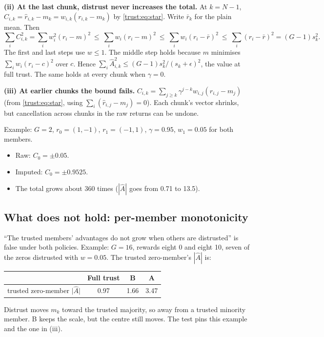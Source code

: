 \textbf{(ii) At the last chunk, distrust never increases the total.} At $k=N-1$,
$C_{i,k}=\hat r_{i,k}-m_k=w_{i,k}(r_{i,k}-m_k)$ by \eqref{trust:eq:star}. Write $\bar r_k$ for the
plain mean. Then
\[
\sum_i C_{i,k}^2=\sum_i w_i^2(r_i-m)^2\ \le\ \sum_i w_i(r_i-m)^2\ \le\ \sum_i w_i(r_i-\bar r)^2\ \le\
\sum_i (r_i-\bar r)^2=(G-1)s_k^2 .
\]
The first and last steps use $w\le1$. The middle step holds because $m$ minimises
$\sum_i w_i(r_i-c)^2$ over $c$. Hence $\sum_i\hat A_{i,k}^2\le (G-1)s_k^2/(s_k+\epsilon)^2$, the
value at full trust. The same holds at every chunk when $\gamma=0$.

\textbf{(iii) At earlier chunks the bound fails.} $C_{i,k}=\sum_{j\ge k}\gamma^{j-k}w_{i,j}(r_{i,j}-m_j)$
(from \eqref{trust:eq:star}, using $\sum_i(\hat r_{i,j}-m_j)=0$). Each chunk's vector shrinks, but
cancellation across chunks in the raw returns can be undone.

Example: $G=2$, $r_0=(1,-1)$, $r_1=(-1,1)$, $\gamma=0.95$, $w_1=0.05$ for both members.
\begin{itemize}
\item Raw: $C_0=\pm0.05$.
\item Imputed: $C_0=\pm0.9525$.
\item The total grows about 360 times ($|\hat A|$ goes from 0.71 to 13.5).
\end{itemize}

\subsection{What does not hold: per-member monotonicity}

``The trusted members' advantages do not grow when others are distrusted'' is false under both
policies. Example: $G=16$, rewards eight 0 and eight 10, seven of the zeros distrusted with
$w=0.05$. The trusted zero-member's $|\hat A|$ is:

\begin{center}
\begin{tabular}{@{}lccc@{}}
\toprule
 & Full trust & B & A\\
\midrule
trusted zero-member $\lvert\hat A\rvert$ & 0.97 & 1.66 & 3.47\\
\bottomrule
\end{tabular}
\end{center}

Distrust moves $m_k$ toward the trusted majority, so away from a trusted minority member. B keeps
the scale, but the centre still moves. The test
 pins this example and the
one in (iii).

